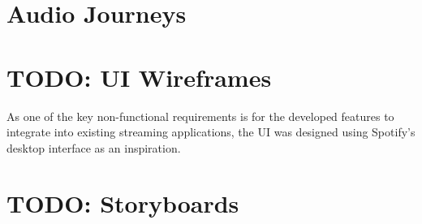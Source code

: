 \section{Audio Journeys}

\section{TODO: UI Wireframes}%
As one of the key non-functional requirements is for the developed features to integrate into existing streaming applications, the UI was designed using Spotify's desktop interface as an inspiration.

\section{TODO: Storyboards}%

